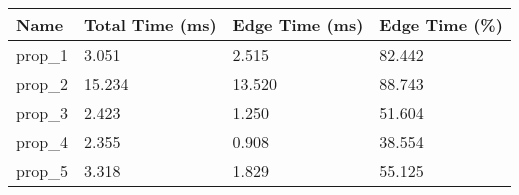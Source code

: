 \begin{tabular}{|llll|}
\hline
Name & Total Time (ms) & Edge Time (ms) & Edge Time (\%)\\\hline
prop_1 & 3.051 & 2.515 & 82.442\\\midrule
prop_2 & 15.234 & 13.520 & 88.743\\\midrule
prop_3 & 2.423 & 1.250 & 51.604\\\midrule
prop_4 & 2.355 & 0.908 & 38.554\\\midrule
prop_5 & 3.318 & 1.829 & 55.125\\\midrule
\hline
\end{tabular}
